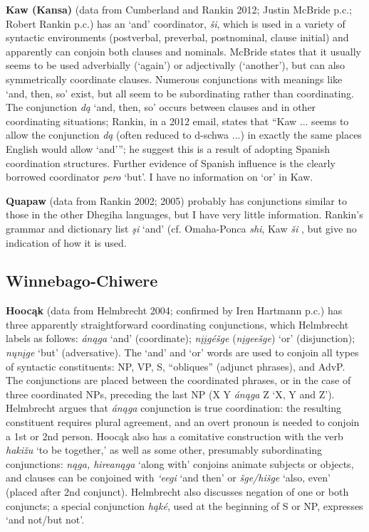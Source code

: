 \documentclass[output=paper]{LSP/langsci}
\begin{document}
\textbf{Kaw (Kansa)} (data from Cumberland and Rankin 2012; Justin McBride p.c.; Robert Rankin p.c.) has an `and' coordinator, \textit{\v{s}i}, which is used in a variety of syntactic environments (postverbal, preverbal, postnominal, clause initial) and apparently can conjoin both clauses and nominals. McBride states that it usually seems to be used adverbially (`again') or adjectivally (`another'), but can also symmetrically coordinate clauses. Numerous conjunctions with meanings like `and, then, so' exist, but all seem to be subordinating rather than coordinating. The conjunction \textit{d\k{a}} `and, then, so' occurs between clauses and in other coordinating situations; Rankin, in a 2012 email, states that ``Kaw ... seems to allow the conjunction \textit{d\k{a}} (often reduced to d-schwa ...) in exactly the same places English would allow `and'''; he suggest this is a result of adopting Spanish coordination structures. Further evidence of Spanish influence is the clearly borrowed coordinator \textit{pero} `but'. I have no information on `or' in Kaw.

\textbf{Quapaw} (data from Rankin 2002; 2005) probably has conjunctions similar to those in the other Dhegiha languages, but I have very little information. Rankin's grammar and dictionary list \textit{\c{s}i} `and' (cf. Omaha-Ponca \textit{shi}, Kaw \textit{\v{s}i} , but give no indication of how it is used.

\subsection{Winnebago-Chiwere}
 
\textbf{Hooc\k{a}k} (data from Helmbrecht 2004; confirmed by Iren Hartmann p.c.) has three apparently straightforward coordinating conjunctions, which Helmbrecht labels as follows: \textit{\'an\k{a}ga} `and' (coordinate); \textit{n\k{i}\k{i}g\'e\v{s}ge} (\textit{n\k{i}gee\v{s}ge}) `or' (disjunction); \textit{n\k{u}n\k{i}ge} `but' (adversative). The `and' and `or' words are used to conjoin all types of syntactic constituents: NP, VP, S, ``obliques'' (adjunct phrases), and AdvP. The conjunctions are placed between the coordinated phrases, or in the case of three coordinated NPs, preceding the last NP (X Y \textit{\'an\k{a}ga} Z `X, Y and Z'). Helmbrecht argues that \textit{\'an\k{a}ga} conjunction is true coordination: the resulting constituent requires plural agreement, and an overt pronoun is needed to conjoin a 1st or 2nd person. Hooc\k{a}k also has a comitative construction with the verb \textit{haki\v{z}u} `to be together,' as well as some other, presumably subordinating conjunctions: \textit{n\k{a}ga, hirean\k{a}ga} `along with' conjoins animate subjects or objects, and clauses can be conjoined with \textit{`eegi} `and then' or \textit{\v{s}ge/hi\v{s}ge} `also, even' (placed after 2nd conjunct). Helmbrecht also discusses negation of one or both conjuncts; a special conjunction \textit{h\k{a}k\'e}, used at the beginning of S or NP, expresses `and not/but not'.
\end{document}
